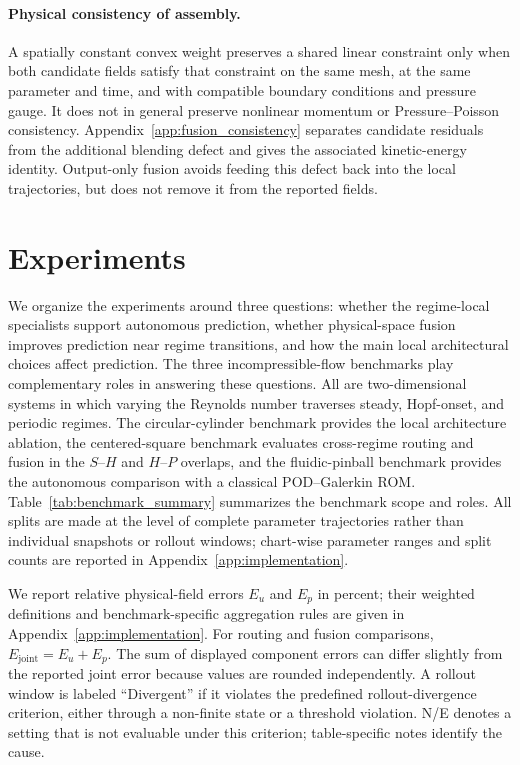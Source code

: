 \documentclass{article}
\providecommand{\DIFaddtex}[1]{{\protect\color{blue} \sf #1}} %
\providecommand{\DIFaddend}{} %
\providecommand{\DIFadd}[1]{\texorpdfstring{\DIFaddtex{#1}}{#1}} %
\DeclareRobustCommand{\DIFaddend}{\DIFOaddend \let\includegraphics\DIFOincludegraphics} %
\begin{document}
\paragraph{\DIFadd{Physical consistency of assembly.}}
\DIFadd{A spatially constant convex weight preserves a shared linear constraint only when both candidate fields satisfy that constraint on the same mesh, at the same parameter and time, and with compatible boundary conditions and pressure gauge. It does not in general preserve nonlinear momentum or Pressure--Poisson consistency. Appendix~\ref{app:fusion_consistency} separates candidate residuals from the additional blending defect and gives the associated kinetic-energy identity. Output-only fusion avoids feeding this defect back into the local trajectories, but does not remove it from the reported fields}\DIFaddend .

\section{Experiments}
\label{sec:experiments}

We organize the experiments around three questions: whether the regime-local specialists support autonomous prediction, whether
physical-space fusion improves prediction near regime transitions, and how the main local architectural choices affect prediction.
The three incompressible-flow benchmarks play complementary roles in answering these questions. All are two-dimensional systems in which varying the Reynolds number traverses steady, Hopf-onset, and periodic regimes. The circular-cylinder benchmark provides the local architecture ablation, the centered-square benchmark evaluates cross-regime routing and fusion in the $S$--$H$ and $H$--$P$ overlaps, and the fluidic-pinball benchmark provides the autonomous comparison with a classical POD--Galerkin ROM. Table~\ref{tab:benchmark_summary} summarizes the benchmark scope and roles. All splits are made at the level of complete parameter trajectories rather than individual snapshots or rollout windows; chart-wise parameter ranges and split counts are reported in Appendix~\ref{app:implementation}.

We report relative physical-field errors $E_u$ and $E_p$ in percent; their weighted definitions and benchmark-specific aggregation rules are given in Appendix~\ref{app:implementation}. For routing and fusion comparisons, $E_{\mathrm{joint}}=E_u+E_p$. The sum of displayed component errors can differ slightly from the reported joint error because values are rounded independently. A rollout window is labeled ``Divergent'' if it violates the predefined rollout-divergence criterion, either through a non-finite state or a
threshold violation. N/E denotes a setting that is not evaluable under this criterion; table-specific notes identify the cause.
\end{document}
